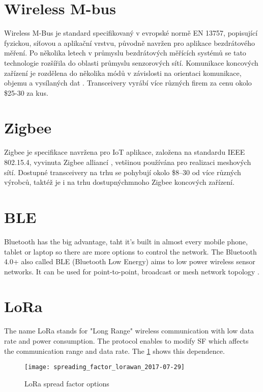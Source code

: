 \section{Wireless M-bus}
Wireless M-Bus je standard specifikovaný v evropské normě EN 13757, popisující fyzickou, síťovou a aplikační vrstvu, původně navržen pro aplikace bezdrátového měření. 
Po několika letech v průmyslu bezdrátových měřících systémů se tato technologie rozšířila do oblasti průmyslu senzorových sítí.
Komunikace koncových zařízení je rozdělena do několika módů v závislosti na orientaci komunikace, objemu a vysílaných dat \cite{wirelessMBus01} \cite{wirelessMBus02}. Transceivery vyrábí více různých firem za cenu okolo \$25-30 za kus.


\section{Zigbee}
Zigbee je specifikace navržena pro IoT aplikace, založena na standardu  IEEE 802.15.4, vyvinuta Zigbee alliancí \cite{Zigbee_alliance}, vetšinou používána pro realizaci meshových sítí.
Dostupné transceivery na trhu se pohybují okolo \$8–30 od více různých výrobců, taktéž je i na trhu dostupnýchmnoho Zigbee koncových zařízení.


\section{BLE}






Bluetooth has the big advantage, taht it's built in almost every mobile phone, tablet or laptop so there are more options to control the network. The Bluetooth 4.0+ also called BLE (Bluetooth Low Energy) aims to low power wireless sensor networks.
It can be used for point-to-point, broadcast or mesh network topology \cite{13} \cite{14} \cite{15} \cite{16}.


\section{LoRa}
The name LoRa stands for "Long Range" wireless communication with low data rate and power consumption. The protocol enables to modify SF which affects the communication range and data rate. The \ref{fig:loraSF} shows this dependence.

\begin{figure}[!h]
    \centering
    \texttt{[image: spreading\_factor\_lorawan\_2017-07-29]}
    \caption{LoRa spread factor options \cite{24}}
    \label{fig:loraSF}
\end{figure}

